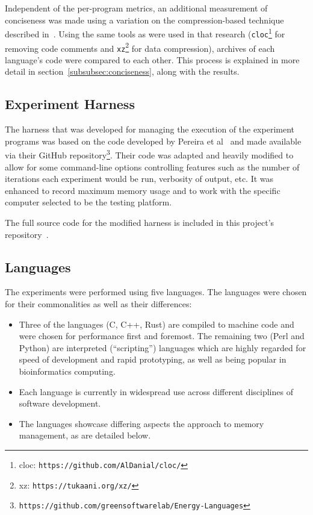 Independent of the per-program metrics, an additional measurement of conciseness was made using a variation on the compression-based technique described in~\cite{bergmans}. Using the same tools as were used in that research (\texttt{cloc}\footnote{cloc: \texttt{https://github.com/AlDanial/cloc/}} for removing code comments and \texttt{xz}\footnote{xz: \texttt{https://tukaani.org/xz/}} for data compression), archives of each language's code were compared to each other. This process is explained in more detail in section~\ref{subsubsec:conciseness}, along with the results.

\subsection{Experiment Harness}
\label{subsec:harness}

The harness that was developed for managing the execution of the experiment programs was based on the code developed by Pereira et al~\cite{pereira} and made available via their GitHub repository\footnote{\texttt{https://github.com/greensoftwarelab/Energy-Languages}}. Their code was adapted and heavily modified to allow for some command-line options controlling features such as the number of iterations each experiment would be run, verbosity of output, etc. It was enhanced to record maximum memory usage and to work with the specific computer selected to be the testing platform.

The full source code for the modified harness is included in this project's repository~\cite{github}.

\subsection{Languages}
\label{subsec:languages}

The experiments were performed using five languages. The languages were chosen for their commonalities as well as their differences:

\begin{itemize}
\item Three of the languages (C, C++, Rust) are compiled to machine code and were chosen for performance first and foremost. The remaining two (Perl and Python) are interpreted (``scripting'') languages which are highly regarded for speed of development and rapid prototyping, as well as being popular in bioinformatics computing.
\item Each language is currently in widespread use across different disciplines of software development.
\item The languages showcase differing aspects the approach to memory management, as are detailed below.
\end{itemize}


